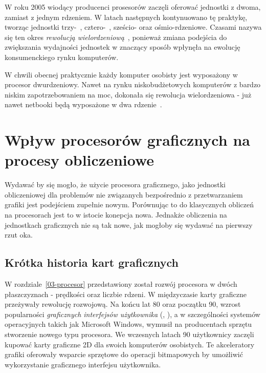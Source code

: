 W roku 2005 wiodący producenci prosesorów zaczęli oferować jednostki z dwoma, zamiast z jednym rdzeniem. W latach następnych kontynuowano tę praktykę, tworząc jednostki trzy-~, cztero-~, sześcio- oraz ośmio-rdzeniowe. Czasami nazywa się ten okres \emph{rewolucją wielordzeniową}~\cite{Cuda:Example}, ponieważ zmiana podejścia do zwiększania wydajności jednostek w znaczący sposób wpłynęła na ewolucję konsumenckiego rynku komputerów.

W chwili obecnej praktycznie każdy komputer osobisty jest wyposażony w procesor dwurdzeniowy. Nawet na rynku niskobudżetowych komputerów z bardzo niskim zapotrzebowaniem na moc, dokonała się rewolucja wielordzeniowa - już nawet netbooki będą wyposażone w dwa rdzenie~\cite{intel:netbook}. 

\section{Wpływ procesorów graficznych na procesy obliczeniowe}

Wydawać by się mogło, że użycie procesora graficznego, jako jednostki obliczeniowej dla problemów nie związanych bezpośrednio z przetwarzaniem grafiki jest podejściem zupełnie nowym. Porównując to do klasycznych obliczeń na procesorach jest to w istocie konepcja nowa. Jednakże obliczenia na jednostkach graficznych nie są tak nowe, jak mogłoby się wydawać na pierwszy rzut oka. 

\subsection{Krótka historia kart graficznych}

W rozdziale~\ref{03-procesor} przedstawiony został rozwój procesora w dwóch płaszczyznach - prędkości oraz liczbie rdzeni. W międzyczasie karty graficzne przeżywały rewolucję rozwojową. Na końcu lat 80 oraz początku 90, wzrost popularności \emph{graficznych interfejsów użytkownika} (, ), a w szczególności systemów operacyjnych takich jak Microsoft Windows, wymusił na producentach sprzętu stworzenie nowego typu procesora. We wczesnych latach 90 użytkownicy zaczęli kupować karty graficzne 2D dla swoich komputerów osobistych. Te akceleratory grafiki oferowały wsparcie sprzętowe do operacji bitmapowych by umożliwić wykorzystanie graficznego interfejsu użytkownika.

